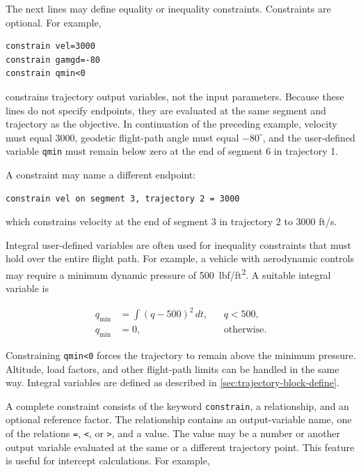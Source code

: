 The next lines may define equality or inequality constraints.  Constraints are
optional.  For example,

\begin{lstlisting}[style=taosmanual]
constrain vel=3000
constrain gamgd=-80
constrain qmin<0
\end{lstlisting}

constrains trajectory output variables, not the input parameters.  Because these lines
do not specify endpoints, they are evaluated at the same segment and trajectory as
the objective.  In continuation of the preceding example, velocity must equal 3000,
geodetic flight-path angle must equal $-80^\circ$, and the user-defined variable
\texttt{qmin} must remain below zero at the end of segment 6 in trajectory 1.

A constraint may name a different endpoint:

\begin{lstlisting}[style=taosmanual]
constrain vel on segment 3, trajectory 2 = 3000
\end{lstlisting}

which constrains velocity at the end of segment 3 in trajectory 2 to 3000 ft/s.

Integral user-defined variables are often used for inequality constraints that must
hold over the entire flight path.  For example, a vehicle with aerodynamic controls
may require a minimum dynamic pressure of
500~lbf/ft\textsuperscript{2}.  A suitable integral variable is

\begin{align}
  q_{\min} &= \int (q-500)^2\,dt,
    && q<500, \label{eq:optimization-qmin-violation}\\
  q_{\min} &= 0,
    && \text{otherwise}. \label{eq:optimization-qmin-satisfied}
\end{align}

Constraining \texttt{qmin<0} forces the trajectory to remain above the minimum
pressure.  Altitude, load factors, and other flight-path limits can be handled in the
same way.  Integral variables are defined as described in
\cref{sec:trajectory-block-define}.


A complete constraint consists of the keyword \texttt{constrain}, a relationship,
and an optional reference factor.  The relationship contains an output-variable name,
one of the relations \texttt{=}, \texttt{<}, or \texttt{>}, and a value.  The value
may be a number or another output variable evaluated at the same or a different
trajectory point.  This feature is useful for intercept calculations.  For example,

